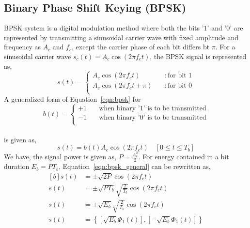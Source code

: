 \documentclass{lab_sheet}
\newcommand\ddfrac[2]{\frac{\displaystyle #1}{\displaystyle #2}}
\begin{document}
\subsection{Binary Phase Shift Keying (BPSK)}
BPSK system is a digital modulation method where both the bits '$1$' and '$0$' are represented by transmitting a sinusoidal carrier wave with fixed amplitude and frequency as $A_c$ and $f_c$, except the carrier phase of each bit differs bt $\pi$. For a sinusoidal carrier wave $s_c(t)=A_c\cos(2\pi f_c t)$, the BPSK signal is represented as,
\begin{equation}
    s(t)=\begin{cases}
        A_c\cos(2\pi f_c t)\quad &: \text{for bit } 1\\
        A_c\cos(2\pi f_c t+\pi)\quad &: \text{for bit } 0\\
    \end{cases}
    \label{eqn:bpsk}
\end{equation}
A generalized form of Equation~\ref{eqn:bpsk} for $$b(t)=\begin{cases}
    +1 \quad & \text{when binary '1' is to be transmitted}\\
    -1 \quad & \text{when binary '0' is to be transmitted}\\
\end{cases}$$ \\is given as,
\begin{equation}
    s(t)=b(t)A_c\cos(2\pi f_c t) \quad [0\leq t \leq T_b]
    \label{eqn:bpsk_general}
\end{equation}
We have, the signal power is given as, $P=\ddfrac{A_c^2}{2}$. For energy contained in a bit duration $E_b=PT_b$, Equation~\ref{eqn:bpsk_general} can be rewritten as,
\begin{equation}
    \begin{aligned}[b]
        s(t)&=\pm\sqrt{2P} \cos(2\pi f_c t)\\
        s(t)&=\pm\sqrt{PT_b} \sqrt{\frac{2}{T_b}} \cos(2\pi f_c t)\\
        s(t)&=\pm\sqrt{E_b}\sqrt{\frac{2}{T_b}} \cos(2\pi f_c t)\\
        s(t)&=\left\{[\sqrt{E_b} \Phi_1(t)],[-\sqrt{E_b} \Phi_1(t)]\right\}
    \end{aligned}
    \label{eqn:bpsk_const}
\end{equation}
\end{document}
